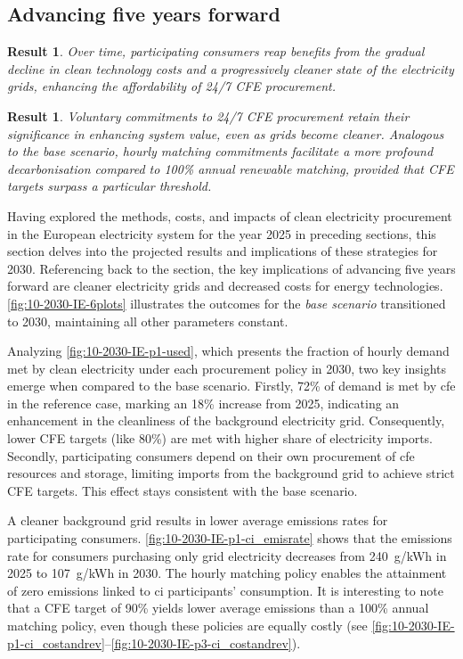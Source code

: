 \documentclass[11pt, 5p, nopreprintline]{elsarticle}
\newcommand{\co}{\ce{CO2}}
\newtheorem{res}[thm]{Result}  %
\begin{document}
\subsection{Advancing five years forward}
\label{subsec:time}

\begin{res}
    Over time, participating consumers reap benefits from the gradual decline in clean technology costs and a progressively cleaner state of the electricity grids, enhancing the affordability of 24/7 CFE procurement.
\end{res}

\begin{res}
    Voluntary commitments to 24/7 CFE procurement retain their significance in enhancing system value, even as grids become cleaner. Analogous to the base scenario, hourly matching commitments facilitate a more profound decarbonisation compared to 100\% annual renewable matching, provided that CFE targets surpass a particular threshold.
\end{res}

Having explored the methods, costs, and impacts of clean electricity procurement in the European electricity system for the year 2025 in preceding sections, this section delves into the projected results and implications of these strategies for 2030.
Referencing back to the  section, the key implications of advancing five years forward are cleaner electricity grids and decreased costs for energy  technologies. \cref{fig:10-2030-IE-6plots} illustrates the outcomes for the \textit{base scenario} transitioned to 2030, maintaining all other parameters constant.

Analyzing \cref{fig:10-2030-IE-p1-used}, which presents the fraction of hourly demand met by clean electricity under each procurement policy in 2030, two key insights emerge when compared to the base scenario.
Firstly, 72\% of demand is met by \gls{cfe} in the reference case, marking an 18\% increase from 2025, indicating an enhancement in the cleanliness of the background electricity grid.
Consequently, lower CFE targets (like 80\%) are met with higher share of electricity imports.
Secondly, participating consumers depend on their own procurement of \gls{cfe} resources and storage, limiting imports from the background grid to achieve strict CFE targets.
This effect stays consistent with the base scenario.

A cleaner background grid results in lower average emissions rates for participating consumers.
\cref{fig:10-2030-IE-p1-ci_emisrate} shows that the emissions rate for consumers purchasing only grid electricity decreases from 240~g\co/kWh in 2025 to 107~g\co/kWh in 2030.
The hourly matching policy enables the attainment of zero emissions linked to \gls{ci} participants' consumption.
It is interesting to note that a CFE target of 90\% yields lower average emissions than a 100\% annual matching policy, even though these policies are equally costly (see \cref{fig:10-2030-IE-p1-ci_costandrev}--\cref{fig:10-2030-IE-p3-ci_costandrev}).
\end{document}
